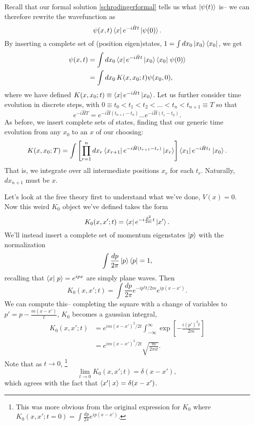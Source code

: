 Recall that our formal solution \ref{schrodingerformal} tells us what $\left| \psi(t) \right>$ is-- we can therefore rewrite the wavefunction as
\begin{equation}
    \psi(x,t)\left< x \right|e^{-i\hat Ht} \left| \psi(0) \right>.
\end{equation}
By inserting a complete set of (position eigen)states, $1=\int dx_0 \left| x_0 \right>\left< x_0 \right|$, we get
\begin{align*}
    \psi(x,t) &=\int dx_0 \bra{x} e^{-i\hat Ht}\ket{x_0} \braket{x_0}{\psi(0)}\\
        &= \int dx_0\, K(x,x_0; t) \psi(x_0,0),
\end{align*}
where we have defined $K(x,x_0;t) \equiv \left< x \right| e^{-i\hat Ht}\left| x_0 \right>$. Let us further consider time evolution in discrete steps, with $0\equiv t_0 < t_1 < t_2 < \ldots < t_n < t_{n+1} \equiv T$ so that
\begin{equation*}
    e^{-i\hat H T}= e^{-i\hat H(t_{n+1}-t_n)} \ldots e^{-i\hat H (t_1-t_0)}.
\end{equation*}
As before, we insert complete sets of states, finding that our generic time evolution from any $x_0$ to an $x$ of our choosing:
\begin{equation}
    K(x,x_0;T) = \int \left[ \prod_{r=1}^n dx_r \left< x_{r+1} \right| e^{-i\hat H(t_{r+1}-t_r)}\left| x_r \right>\right] \left< x_1 \right|e^{-i\hat H t_1}\left| x_0 \right>.
\end{equation}
That is, we integrate over all intermediate positions $x_r$ for each $t_r$. Naturally, $dx_{n+1}$ must be $x$.

Let's look at the free theory first to understand what we've done, $V(x)=0$. Now this weird $K_0$ object we've defined takes the form
\begin{equation}
    K_0(x,x'; t)=\left< x \right|e^{-i \frac{\hat p^2}{2m} t}\left| x' \right>.
\end{equation}
We'll instead insert a complete set of momentum eigenstates $\left| p \right>$ with the normalization
\begin{equation*}
    \int \frac{dp}{2\pi}\left| p \right>\left< p \right|=1,
\end{equation*}
recalling that $\braket{x}{p}=e^{ipx}$ are simply plane waves. Then
\begin{equation*}
    K_0 (x,x'; t)=\int \frac{dp}{2\pi} e^{-i p^2 t/2m} e^{ip (x-x')}.
\end{equation*}
We can compute this-- completing the square with a change of variables to $p'=p- \frac{m(x-x')}{t}$, $K_0$ becomes a gaussian integral,
\begin{align*}
    K_0(x,x';t) &= e^{im(x-x')^2/2t} \int_{-\infty}^\infty \exp \left[-\frac{i(p')^2 t}{2m}\right]\\
    &= e^{im(x-x')^2/2t} \sqrt{\frac{m}{2\pi i t}}.
\end{align*}
Note that as $t\to 0$,%
    \footnote{This was more obvious from the original expression for $K_0$ where $K_0(x,x'; t=0)= \int \frac{dp}{2\pi} e^{ip(x-x')}.$}
\begin{equation*}
    \lim_{t\to 0} K_0(x,x'; t)=\delta(x-x'),
\end{equation*}
which agrees with the fact that $\braket{x'}{x}=\delta(x-x')$.

